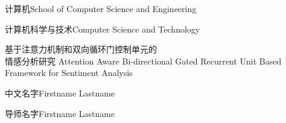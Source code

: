 
\school
{计算机}{School of Computer Science and Engineering}

\major
{计算机科学与技术}{Computer Science and Technology}

\thesistitle
{基于注意力机制和双向循环门控制单元的\\情感分析研究}
{}
{Attention Aware Bi-directional Gated Recurrent Unit Based Framework for Sentiment Analysis}
{}

\thesisauthor
{中文名字}{Firstname Lastname}

\teacher
{导师名字}{Firstname Lastname}






